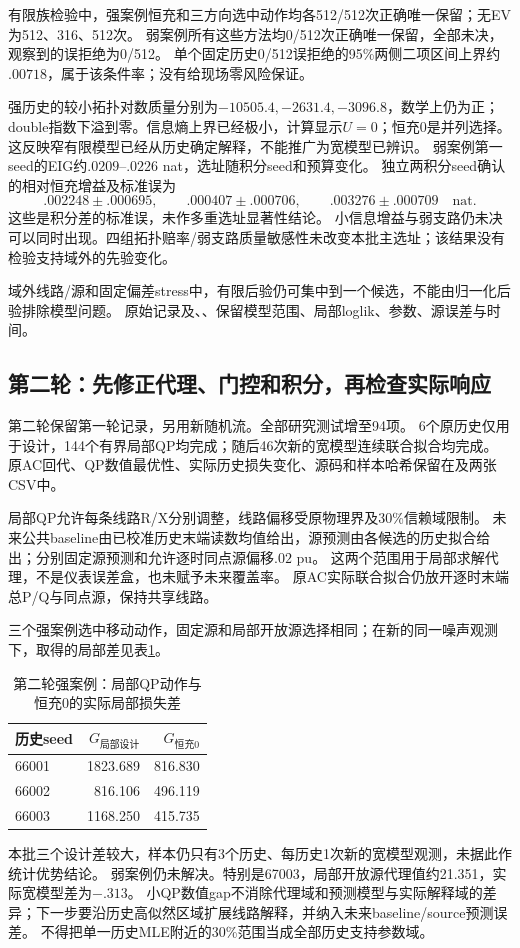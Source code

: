 \documentclass[UTF8,fontset=fandol,11pt,a4paper]{ctexart}
\begin{document}
有限族检验中，强案例恒充和三方向选中动作均各512/512次正确唯一保留；无EV为512、316、512次。
弱案例所有这些方法均0/512次正确唯一保留，全部未决，观察到的误拒绝为0/512。
单个固定历史0/512误拒绝的95\%两侧二项区间上界约$.00718$，属于该条件率；没有给现场零风险保证。

强历史的较小拓扑对数质量分别为$-10505.4,-2631.4,-3096.8$，数学上仍为正；double指数下溢到零。信息熵上界已经极小，计算显示$U=0$；恒充0是并列选择。
这反映窄有限模型已经从历史确定解释，不能推广为宽模型已辨识。
弱案例第一seed的EIG约$.0209$--$.0226$ nat，选址随积分seed和预算变化。
独立两积分seed确认的相对恒充增益及标准误为
\[
 .002248\pm.000695,\qquad
 .000407\pm.000706,\qquad
 .003276\pm.000709\quad\text{nat}.
\]
这些是积分差的标准误，未作多重选址显著性结论。
小信息增益与弱支路仍未决可以同时出现。四组拓扑赔率/弱支路质量敏感性未改变本批主选址；该结果没有检验支持域外的先验变化。

域外线路/源和固定偏差stress中，有限后验仍可集中到一个候选，不能由归一化后验排除模型问题。
原始记录及、、保留模型范围、局部loglik、参数、源误差与时间。


\subsection{第二轮：先修正代理、门控和积分，再检查实际响应}
第二轮保留第一轮记录，另用新随机流。全部研究测试增至94项。
6个原历史仅用于设计，144个有界局部QP均完成；随后46次新的宽模型连续联合拟合均完成。
原AC回代、QP数值最优性、实际历史损失变化、源码和样本哈希保留在及两张CSV中。

局部QP允许每条线路R/X分别调整，线路偏移受原物理界及30\%信赖域限制。
未来公共baseline由已校准历史末端读数均值给出，源预测由各候选的历史拟合给出；分别固定源预测和允许逐时同点源偏移$.02$ pu。
这两个范围用于局部求解代理，不是仪表误差盒，也未赋予未来覆盖率。
原AC实际联合拟合仍放开逐时末端总P/Q与同点源，保持共享线路。

三个强案例选中移动动作，固定源和局部开放源选择相同；在新的同一噪声观测下，取得的局部差见表\ref{tab:refined}。
\begin{table}[htbp]\centering
\caption{第二轮强案例：局部QP动作与恒充0的实际局部损失差}\label{tab:refined}
\begin{tabular}{lrr}\toprule
历史seed & $G_{\text{局部设计}}$ & $G_{\text{恒充0}}$\\\midrule
66001 & 1823.689 & 816.830 \\
66002 & 816.106 & 496.119 \\
66003 & 1168.250 & 415.735 \\
\bottomrule\end{tabular}\end{table}
本批三个设计差较大，样本仍只有3个历史、每历史1次新的宽模型观测，未据此作统计优势结论。
弱案例仍未解决。特别是67003，局部开放源代理值约21.351，实际宽模型差为$-.313$。
小QP数值gap不消除代理域和预测模型与实际解释域的差异；下一步要沿历史高似然区域扩展线路解释，并纳入未来baseline/source预测误差。
不得把单一历史MLE附近的30\%范围当成全部历史支持参数域。
\end{document}
